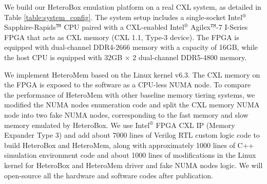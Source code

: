 



We build our HeteroBox emulation platform on a real CXL system, as detailed in Table \ref{table:system_config}. The system setup includes a single-socket Intel$^\circledR$ Sapphire-Rapids$^\texttt{TM}$ CPU paired with a CXL-enabled Intel$^\circledR$ Agilex$^\texttt{TM}$-7 I-Series FPGA that acts as CXL memory (CXL 1.1, Type-3 device). The FPGA is equipped with dual-channel DDR4-2666 memory with a capacity of 16GB, while the host CPU is equipped with 32GB $\times$ 2 dual-channel DDR5-4800 memory.

We implement HeteroMem based on the Linux kernel v6.3. The CXL memory on the FPGA is exposed to the software as a CPU-less NUMA node. To compare the performance of HeteroMem with other baseline memory tiering systems, we modified the NUMA nodes enumeration code and split the CXL memory NUMA node into two fake NUMA nodes, corresponding to the fast memory and slow memory emulated by HeteroBox.
We use Intel$^\circledR$ FPGA CXL IP (Memory Expander Type 3) and add about 7000 lines of Verilog RTL custom logic code to build HeteroBox and HeteroMem, along with approximately 1000 lines of C++ simulation environment code and about 1000 lines of modifications in the Linux kernel for HeteroBox and HeteroMem driver and fake NUMA nodes logic. 
We will open-source all the hardware and software codes after publication.



